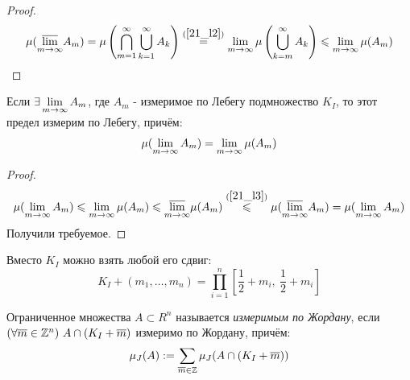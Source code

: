 \begin{proof}
		\[\mu(\us{m\ra\i}{\v\lim}A_m)=\mu\l(\bigcap_{m=1}^\i\bc_{k=1}^\i A_k\r)\overset{(\ref{21_l2})}{=}\lim_{m\ra\i}\mu\l(\bc_{k=m}^\i A_k\r)\le\lim_{m\ra\i}\mu(A_m)\]
\end{proof}
\begin{theorem}
	Если $\ex\lim_{m\ra\i}A_m$, где $A_m$ - измеримое по Лебегу подмножество $K_I$, то этот предел измерим по Лебегу, причём:
	\[\mu(\lim_{m\ra\i}A_m)=\lim_{m\ra\i}\mu(A_m)\]
\end{theorem}
\begin{proof}
	\[\mu(\lim_{m\ra\i}A_m)\le\lim_{m\ra\i}\mu(A_m)\le\us{m\ra\i}{\v\lim}\mu(A_m)\overset{(\ref{21_l3})}{\le}\mu(\us{m\ra\i}{\v\lim}A_m)=\mu(\lim_{m\ra\i}A_m)\]
	Получили требуемое.
\end{proof}
\begin{note}
	Вместо $K_I$ можно взять любой его сдвиг:
	\[K_I+(m_1,\dots,m_n)=\prod_{i=1}^n[\frac12+m_i,\ \frac12+m_i]\]
\end{note}
\begin{definition}
	Ограниченное множества $A\subset R^n$ называется \textit{измеримым по Жордану}, если $(\forall\overline m\in\mathbb{Z}^n)\ A\cap(K_I+\overline m)$ измеримо по Жордану, причём:
	\[\mu_J(A):=\sum_{\v m\in\Z}\mu_J(A\cap(K_I+\v m))\]
\end{definition}
